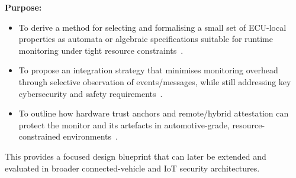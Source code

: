 \textbf{Purpose:}
\begin{itemize}
  \item To derive a method for selecting and formalising a small set of ECU-local properties as automata or algebraic specifications suitable for runtime monitoring under tight resource constraints~\cite{krichen2023survey,zhang2024context,dehoz2022iotdt}.
  \item To propose an integration strategy that minimises monitoring overhead through selective observation of events/messages, while still addressing key cybersecurity and safety requirements~\cite{ekert2021cybersecurity,krichen2023survey,zhang2024context,dehoz2022iotdt,lorych2024hta}.
  \item To outline how hardware trust anchors and remote/hybrid attestation can protect the monitor and its artefacts in automotive-grade, resource-constrained environments~\cite{williams2022survey,saadat2024rosmonitoring2,plappert2023hta}.
\end{itemize}

This provides a focused design blueprint that can later be extended and evaluated in broader connected-vehicle and IoT security architectures.